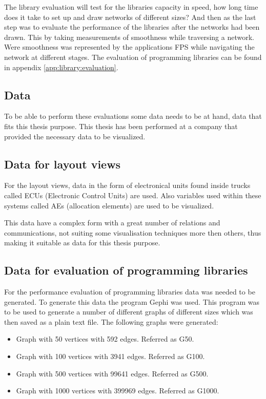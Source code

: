 \documentclass[a4paper,11pt]{kth-mag}
\begin{document}
The library evaluation will test for the libraries capacity in speed, how long time does it take to set up and draw networks of different sizes? And then as the last step was to evaluate the performance 
of the libraries after the networks had been drawn. This by taking measurements of smoothness while traversing a network. Were smoothness was represented by the applications FPS while navigating the 
network at different stages. The evaluation of programming libraries can be found in appendix \ref{app:library:evaluation}.
\subsection{Data}
To be able to perform these evaluations some data needs to be at hand, data that fits this thesis purpose. This thesis has been performed at a company that provided the necessary data to be visualized.
\subsection{Data for layout views}
\label{data:layout-views}
For the layout views, data in the form of electronical units found inside trucks called ECUs (Electronic Control Units) are used. Also variables used within these systems called AEs (allocation elements)
 are used to be visualized. 
 
This data have a complex form with a great number of relations and communications, not suiting some visualisation techniques more then others, thus making it suitable as data for this thesis purpose.
\subsection{Data for evaluation of programming libraries}
For the performance evaluation of programming libraries data was needed to be generated. To generate this data the program Gephi\cite{website:gephi} was used. This program was to be used to generate a number of different 
graphs of different sizes which was then saved as a plain text file. The following graphs were generated:\
\begin{itemize}
	\item{Graph with 50 vertices with 592 edges. Referred as G50.}
	\item{Graph with 100 vertices with 3941 edges. Referred as G100.}
	\item{Graph with 500 vertices with 99641 edges. Referred as G500.}
	\item{Graph with 1000 vertices with 399969 edges. Referred as G1000.}
\end{itemize}
\end{document}
